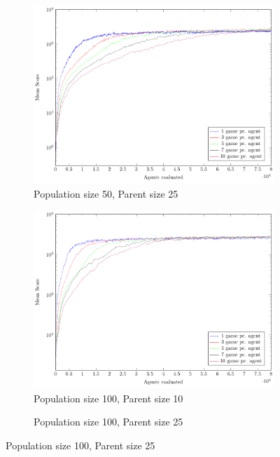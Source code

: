 \begin{figure}
\begin{subfigure}[b]{0.49\textwidth}
    	\caption{Population size 50, Parent size 25}
        \includegraphics[width=\textwidth]{data/ce_population_offspring/50x_split/constant_l50_o25/mean/PlotFile.pdf}
    \end{subfigure}
    \begin{subfigure}[b]{0.49\textwidth}
    	\caption{Population size 100, Parent size 10}
        \includegraphics[width=\textwidth]{data/ce_population_offspring/100x_split/constant_l100_o10/mean/PlotFile.pdf}
    \end{subfigure}
    \begin{subfigure}[b]{0.49\textwidth}
    	\caption{Population size 100, Parent size 25}

\end{subfigure}
\end{figure}
